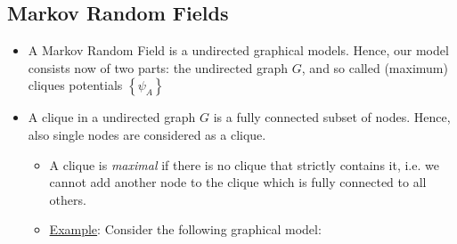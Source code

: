 \subsection{Markov Random Fields}
\begin{itemize}
	\item A Markov Random Field is a undirected graphical models. Hence, our model consists now of two parts: the undirected graph $G$, and so called (maximum) cliques potentials $\left\{\psi_A\right\}$
	\item A clique in a undirected graph $G$ is a fully connected subset of nodes. Hence, also single nodes are considered as a clique.
	\begin{itemize}
		\item A clique is \textit{maximal} if there is no clique that strictly contains it, i.e. we cannot add another node to the clique which is fully connected to all others. 
		\item \underline{Example}: Consider the following graphical model:
		\begin{figure}[ht!]
			\centering
		\end{figure}
	

\end{itemize}
\end{itemize}
